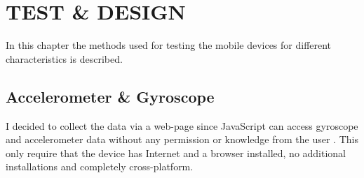 \chapter{TEST \& DESIGN}\label{cha:test}
In this chapter the methods used for testing the mobile devices for different characteristics is described. 

\section{Accelerometer \& Gyroscope}\label{sec:test:motion}
I decided to collect the data via a web-page since JavaScript can access gyroscope and accelerometer data without any permission or knowledge from the user \cite[]{sensor:DeviceOrientation:spec}. This only require that the device has Internet and a browser installed, no additional installations and completely cross-platform. \\
